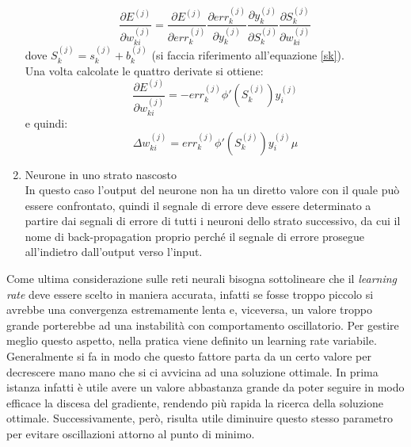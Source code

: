 \begin{enumerate}
	\begin{equation}
	\frac{\partial E^{(j)} }{\partial w_{ki}^{(j)}} = \frac{\partial E^{(j)}}{\partial err_k^{(j)}}
	\frac{\partial err_k^{(j)}}{\partial y_k^{(j)}}
	\frac{\partial y_k^{(j)}}{\partial S_k^{(j)}}
	\frac{\partial S_k^{(j)}}{\partial w_{ki}^{(j)}}
	\end{equation}
	dove $S_k^{(j)} = s_k^{(j)} + b_k^{(j)} $ (si faccia riferimento all'equazione \eqref{sk}). \\
	Una volta calcolate le quattro derivate si ottiene:
	\begin{equation}
	\frac{\partial E^{(j)} }{\partial w_{ki}^{(j)}} =
	-err_k^{(j)}\phi'(S_k^{(j)})y_i^{(j)}
	\end{equation}
	e quindi:
	\begin{equation}
	\Delta w_{ki}^{(j)} = err_k^{(j)}\phi'(S_k^{(j)})y_i^{(j)} \mu
	\end{equation}
	
	\item Neurone in uno strato nascosto \\
	In questo caso l'output del neurone non ha un diretto valore con il quale può essere confrontato, quindi il segnale di errore deve essere determinato a partire dai segnali di errore di tutti i neuroni dello strato successivo, da cui il nome di back-propagation proprio perché il segnale di errore prosegue all'indietro dall'output verso l'input.
\end{enumerate}
Come ultima considerazione sulle reti neurali bisogna sottolineare che il \textit{learning rate} deve essere scelto in maniera accurata, infatti se fosse troppo piccolo si avrebbe una convergenza estremamente lenta e, viceversa, un valore troppo grande porterebbe ad una instabilità con comportamento oscillatorio. Per gestire meglio questo aspetto, nella pratica viene definito un learning rate variabile. Generalmente si fa in modo che questo fattore parta da un certo valore per decrescere mano mano che si ci avvicina ad una soluzione ottimale. In prima istanza infatti è utile avere un valore abbastanza grande da poter seguire in modo efficace la discesa del gradiente, rendendo più rapida la ricerca della soluzione ottimale. Successivamente, però, risulta utile diminuire questo stesso parametro per evitare oscillazioni attorno al punto di minimo.

\newpage


